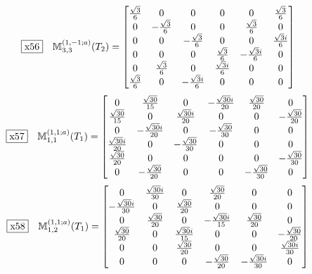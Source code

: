 \documentclass[fleqn,10pt,landscape]{jsarticle}
\begin{document}
\begin{dmath*}
\fbox{x56}\quad \mathbb{M}_{3,3}^{(1,-1;a)}(T_{2})=\begin{bmatrix} \frac{\sqrt{3}}{6} & 0 & 0 & 0 & 0 & \frac{\sqrt{3}}{6} \\ 0 & - \frac{\sqrt{3}}{6} & 0 & 0 & \frac{\sqrt{3}}{6} & 0 \\ 0 & 0 & - \frac{\sqrt{3}}{6} & 0 & 0 & \frac{\sqrt{3} i}{6} \\ 0 & 0 & 0 & \frac{\sqrt{3}}{6} & - \frac{\sqrt{3} i}{6} & 0 \\ 0 & \frac{\sqrt{3}}{6} & 0 & \frac{\sqrt{3} i}{6} & 0 & 0 \\ \frac{\sqrt{3}}{6} & 0 & - \frac{\sqrt{3} i}{6} & 0 & 0 & 0 \end{bmatrix}
\end{dmath*}
\begin{dmath*}
\fbox{x57}\quad \mathbb{M}_{1,1}^{(1,1;a)}(T_{1})=\begin{bmatrix} 0 & \frac{\sqrt{30}}{15} & 0 & - \frac{\sqrt{30} i}{20} & \frac{\sqrt{30}}{20} & 0 \\ \frac{\sqrt{30}}{15} & 0 & \frac{\sqrt{30} i}{20} & 0 & 0 & - \frac{\sqrt{30}}{20} \\ 0 & - \frac{\sqrt{30} i}{20} & 0 & - \frac{\sqrt{30}}{30} & 0 & 0 \\ \frac{\sqrt{30} i}{20} & 0 & - \frac{\sqrt{30}}{30} & 0 & 0 & 0 \\ \frac{\sqrt{30}}{20} & 0 & 0 & 0 & 0 & - \frac{\sqrt{30}}{30} \\ 0 & - \frac{\sqrt{30}}{20} & 0 & 0 & - \frac{\sqrt{30}}{30} & 0 \end{bmatrix}
\end{dmath*}
\begin{dmath*}
\fbox{x58}\quad \mathbb{M}_{1,2}^{(1,1;a)}(T_{1})=\begin{bmatrix} 0 & \frac{\sqrt{30} i}{30} & 0 & \frac{\sqrt{30}}{20} & 0 & 0 \\ - \frac{\sqrt{30} i}{30} & 0 & \frac{\sqrt{30}}{20} & 0 & 0 & 0 \\ 0 & \frac{\sqrt{30}}{20} & 0 & - \frac{\sqrt{30} i}{15} & \frac{\sqrt{30}}{20} & 0 \\ \frac{\sqrt{30}}{20} & 0 & \frac{\sqrt{30} i}{15} & 0 & 0 & - \frac{\sqrt{30}}{20} \\ 0 & 0 & \frac{\sqrt{30}}{20} & 0 & 0 & \frac{\sqrt{30} i}{30} \\ 0 & 0 & 0 & - \frac{\sqrt{30}}{20} & - \frac{\sqrt{30} i}{30} & 0 \end{bmatrix}
\end{dmath*}
\end{document}
